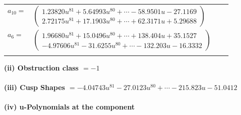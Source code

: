 \documentclass[1p]{elsarticle_modified}
\theoremstyle{definition}
\begin{document}
\begin{tabular}{m{7pt} m{180pt} m{7pt} m{180pt} }
\flushright $a_{10}=$&$\begin{pmatrix}1.23820 u^{81}+5.64993 u^{80}+\cdots-58.9501 u-27.1169\\2.72175 u^{81}+17.1903 u^{80}+\cdots+62.3171 u+5.29688\end{pmatrix}$ \\
\flushright $a_{6}=$&$\begin{pmatrix}1.96680 u^{81}+15.0496 u^{80}+\cdots+138.404 u+35.1527\\-4.97606 u^{81}-31.6255 u^{80}+\cdots-132.203 u-16.3332\end{pmatrix}$\\&\end{tabular}
\flushleft \textbf{(ii) Obstruction class $= -1$}\\~\\
\flushleft \textbf{(iii) Cusp Shapes $= -4.04743 u^{81}-27.0123 u^{80}+\cdots-215.823 u-51.0412$}\\~\\
\newpage\renewcommand{\arraystretch}{1}
\flushleft \textbf{(iv) u-Polynomials at the component}\newline \\
\end{document}
